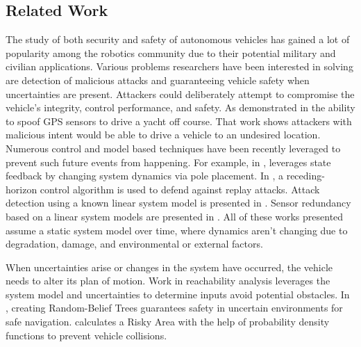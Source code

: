 




\subsection{Related Work}
\label{sec:Related Work}

The study of both security and safety of autonomous vehicles has gained a lot of popularity among the robotics community due to their potential military and civilian applications. Various problems researchers have been interested in solving are detection of malicious attacks and guaranteeing vehicle safety when uncertainties are present. Attackers could deliberately attempt to compromise the vehicle's integrity, control performance, and safety. As demonstrated in \cite{lee} the ability to spoof GPS sensors to drive a yacht off course. That work shows attackers with malicious intent would be able to drive a vehicle to an undesired location. Numerous control and model based techniques have been recently leveraged to prevent such future events from happening. For example, in \cite{6426811}, leverages state feedback by changing system dynamics via pole placement. In \cite{zhu2012resilient}, a receding-horizon control algorithm is used to defend against replay attacks. Attack detection using a known linear system model is presented in \cite{pasqualetti2013attack}. Sensor redundancy based on a linear system models are presented in \cite{fawzi2014secure,6943080,7330811}. All of these works presented assume a static system model over time, where dynamics aren't changing due to degradation, damage, and environmental or external factors.

When uncertainties arise or changes in the system have occurred, the vehicle needs to alter its plan of motion. Work in reachability analysis \cite{8046382,7799325,5980268} leverages the system model and uncertainties to determine inputs avoid potential obstacles. In \cite{5980508}, creating Random-Belief Trees guarantees safety in uncertain environments for safe navigation. \cite{6934041} calculates a Risky Area with the help of probability density functions to prevent vehicle collisions.

